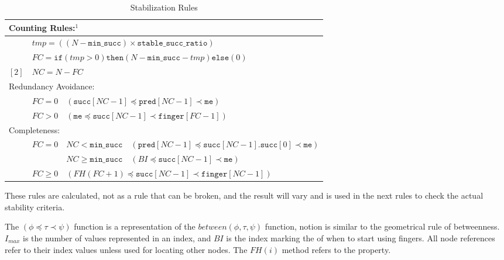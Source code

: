 \begin{table}[htp]
\centering
\begin{tabular}{|r|c|c|l|}                                                                                  \hline
\multicolumn{4}{|l|}{
Counting Rules:$^1$} \\ \hline
[1] & \multicolumn{3}{|l|}{$tmp = ((N-{\mathtt{min\_succ}})\times{\mathtt{stable\_succ\_ratio}} ) $ }         \\
    & \multicolumn{3}{|l|}{$FC  = \mathtt{if}( tmp > 0 )\mathtt{then}( N - {\mathtt{min\_succ}} - tmp )\mathtt{else}( 0 )$}         \\ 
$\left[2\right]$ & \multicolumn{3}{|l|}{$NC  = N - FC $ }                                                             \\ \hline
\multicolumn{4}{|l|}{Redundancy Avoidance:}                                                              \\ \hline
[3]& $FC=0$ &\multicolumn{2}{|l|}{$(\mathtt{succ}[NC-1]\preceq\mathtt{pred}  [NC-1]\prec\mathtt{me})$}\\
\  & $FC>0$ &\multicolumn{2}{|l|}{$(\mathtt{me}\preceq\mathtt{succ}[NC-1]\prec\mathtt{finger}[FC-1])$}\\ \hline
\multicolumn{4}{|l|}{Completeness:}                                                                      \\ \hline
[4]& $FC = 0$ & $NC<{\mathtt{min\_succ}}$  &
                $(\mathtt{pred}[NC-1]\preceq\mathtt{succ}[NC-1]\mathtt{.succ}[0]\prec\mathtt{me})$     \\
\  &\         & $NC\geq\mathtt{min\_succ}$ & $(BI\preceq\mathtt{succ}[NC-1]\prec\mathtt{me})$          \\ 
\  &$FC\geq 0$& \multicolumn{2}{|l|}{$(FH(FC+1)\preceq\mathtt{succ}[NC-1]\prec\mathtt{finger}[NC-1])$} \\ \hline
\end{tabular}
\parbox{.9\linewidth}{
\begin{enumerate}{\footnotesize
\item These rules are calculated, not  as a rule that
   can be broken, and the result will vary and is used in the next rules
   to check the actual stability criteria.}
\end{enumerate}
\small
The $(\phi\preceq\tau\prec\psi)$ function is a representation of the
 $between(\phi, \tau, \psi)$ function, notion is similar to the geometrical rule of
 betweenness. $I_{max}$ is the number of values represented in an index, and $BI$ is
 the index marking the  of when to start using fingers. All node references
 refer to their index values unless used for locating other nodes. The $FH(i)$ method
 refers to the  property. }
\caption{Stabilization Rules}
\label{tab:stabilization-rules}
\end{table}

